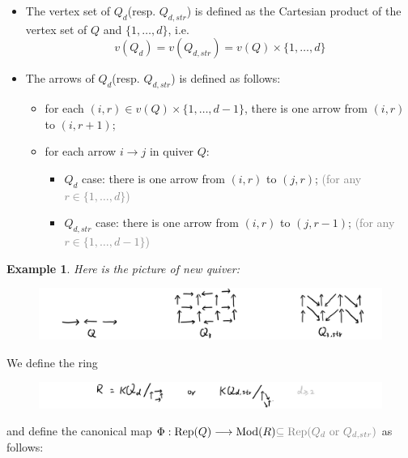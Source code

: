 \documentclass[reqno,11pt]{amsart}
\numberwithin{equation}{section}
\theoremstyle{plain}
\newtheorem{eg}[theorem]{Example}
\theoremstyle{plain}
\numberwithin{equation}{section}
\theoremstyle{remark}
\DeclareMathOperator{\Rep}{\operatorname{Rep}}
\DeclareMathOperator{\Mod}{\operatorname{Mod}}
\begin{document}
\begin{itemize}
	\item The vertex set of $Q_d$(resp. $Q_{d,str}$) is defined as the Cartesian product of the vertex set of $Q$ and $\{1,\ldots,d\}$, i.e.
	$$v(Q_d)=v(Q_{d,str})=v(Q) \times \{1,\ldots,d\}$$
	\item  The arrows of $Q_d$(resp. $Q_{d,str}$) is defined as follows:
	\begin{itemize}
		\item for each $(i,r) \in v(Q) \times \{1,\ldots,d-1\}$, there is one arrow from $(i,r)$ to $(i,r+1)$;
		\item for each arrow $i \longrightarrow j$ in quiver $Q$:
		\begin{itemize}
			\item $Q_d$ case: there is one arrow from $(i,r)$ to $(j,r)$; \textcolor{gray}{(for any $r \in \{1,\ldots,d\}$)}
			\item $Q_{d,str}$ case: there is one arrow from $(i,r)$ to $(j,r-1)$; \textcolor{gray}{(for any $r \in \{1,\ldots,d-1\}$)}			
		\end{itemize}
	\end{itemize}
\end{itemize}
\begin{eg}
Here is the picture of new quiver:
\begin{center}
	\begin{figure}[ht]\label{fig:newquiver}
		\vspace{0cm}
		\centering
		\includegraphics[width=15cm]{figures/newquiver.png}
		\caption{}
	\end{figure}
\end{center}
\end{eg}
We define the ring 
\begin{center}
	\begin{figure}[ht]\label{fig:newring}
		\vspace{0cm}
		\centering
		\includegraphics[width=15cm]{figures/newring.png}
	\end{figure}
\end{center}
and define the canonical map $\Phi:\Rep(Q) \longrightarrow \Mod(R) \textcolor{gray}{\subseteq \Rep(Q_d \text{ or } Q_{d,str})}$ as follows:
\end{document}
